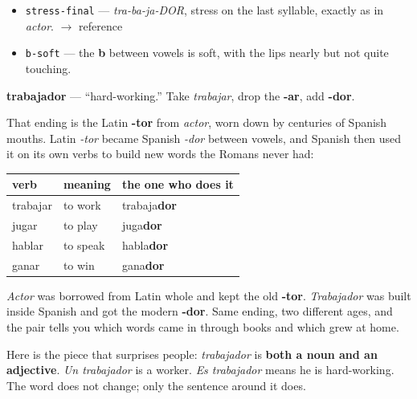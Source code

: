 \begin{sounds}
\begin{itemize}
\raggedright
  \item \texttt{stress-final} — \emph{tra-ba-ja-DOR}, stress on the last syllable, exactly as in \emph{actor}. $\to$ reference
  \item \texttt{b-soft} — the \textbf{b} between vowels is soft, with the lips nearly but not quite touching.
\end{itemize}
\end{sounds}

\begin{cousinweb}
\textbf{trabajador} — \textquotedblleft{}hard-working.\textquotedblright{} Take \emph{trabajar}, drop the \textbf{-ar}, add \textbf{-dor}.

That ending is the Latin \textbf{-tor} from \emph{actor}, worn down by centuries of Spanish mouths. Latin \emph{-tor} became Spanish \emph{-dor} between vowels, and Spanish then used it on its own verbs to build new words the Romans never had:

\noindent
\begin{tabularx}{\linewidth}{@{}>{\raggedright\arraybackslash}X>{\raggedright\arraybackslash}X>{\raggedright\arraybackslash}X@{}}
\toprule
\textbf{verb} & \textbf{meaning} & \textbf{the one who does it} \\
\midrule
trabajar & to work & trabaja\textbf{dor} \\
jugar & to play & juga\textbf{dor} \\
hablar & to speak & habla\textbf{dor} \\
ganar & to win & gana\textbf{dor} \\
\bottomrule
\end{tabularx}

\emph{Actor} was borrowed from Latin whole and kept the old \textbf{-tor}. \emph{Trabajador} was built inside Spanish and got the modern \textbf{-dor}. Same ending, two different ages, and the pair tells you which words came in through books and which grew at home.

Here is the piece that surprises people: \emph{trabajador} is \textbf{both a noun and an adjective}. \emph{Un trabajador} is a worker. \emph{Es trabajador} means he is hard-working. The word does not change; only the sentence around it does.
\end{cousinweb}

